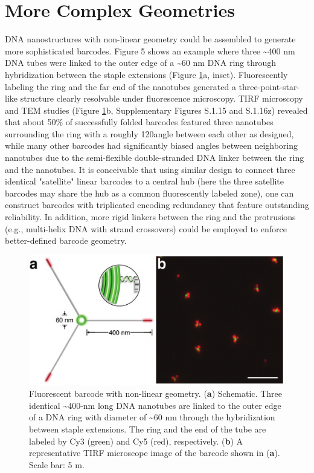 \section{More Complex Geometries}
DNA nanostructures with non-linear geometry could be assembled to generate 
more sophisticated barcodes. Figure 5 shows an example where three \textasciitilde400 nm DNA 
tubes were linked to the outer edge of a \textasciitilde60 nm DNA ring through hybridization between 
the staple extensions (Figure \ref{fig:dna5}a, inset). Fluorescently labeling the ring and the far end of 
the nanotubes generated a three-point-star-like structure clearly resolvable under 
fluorescence microscopy. TIRF microscopy and TEM studies (Figure \ref{fig:dna5}b, Supplementary Figures S.1.15 and S.1.16z) revealed that about 50\% of successfully folded barcodes featured three nanotubes 
surrounding the ring with a roughly 120\textdegree angle between each other as designed, while 
many other barcodes had significantly biased angles between neighboring nanotubes due 
to the semi-flexible double-stranded DNA linker between the ring and the nanotubes. It is 
conceivable that using similar design to connect three identical "satellite" linear barcodes 
to a central hub (here the three satellite barcodes may share the hub as a common 
fluorescently labeled zone), one can construct barcodes with triplicated encoding 
redundancy that feature outstanding reliability. In addition, more rigid linkers between 
the ring and the protrusions (e.g., multi-helix DNA with strand crossovers) could be 
employed to enforce better-defined barcode geometry. 


\begin{figure} %
\includegraphics[width=\textwidth]{figures/dna5}
\caption[Fluorescent barcode with non-linear geometry.]{Fluorescent barcode with non-linear geometry. (\textbf{a}) Schematic. Three identical 
\textasciitilde400-nm long DNA nanotubes are linked to the outer edge of a DNA ring with diameter 
of \textasciitilde60 nm through the hybridization between staple extensions. The ring and the end of 
the tube are labeled by Cy3 (green) and Cy5 (red), respectively. (\textbf{b}) A representative 
TIRF microscope image of the barcode shown in (\textbf{a}). Scale bar: 5 \textmu m. 
\label{fig:dna5}}
\end{figure}



